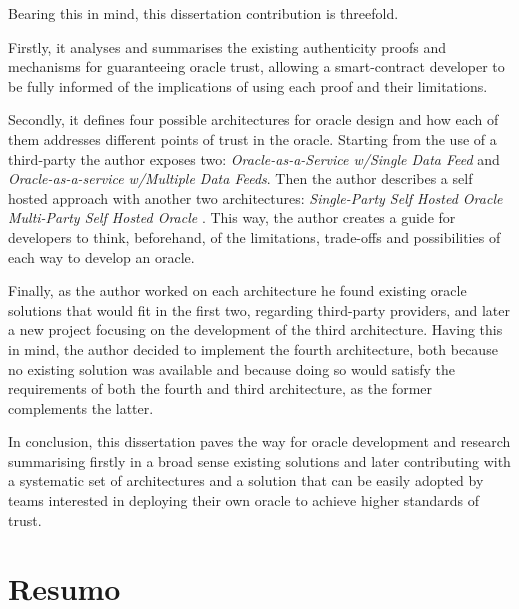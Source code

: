 Bearing this in mind, this dissertation contribution is threefold.

Firstly, it analyses and summarises the existing authenticity proofs and mechanisms for guaranteeing oracle trust, allowing a smart-contract developer to be fully informed of the implications of using each proof and their limitations.

Secondly, it defines four possible architectures for oracle design and how each of them addresses different points of trust in the oracle. Starting from the use of a third-party the author exposes two: \textit{Oracle-as-a-Service w/Single Data Feed} and \textit{Oracle-as-a-service w/Multiple Data Feeds}. Then the author describes a self hosted approach with another two architectures: \textit{Single-Party Self Hosted Oracle} \textit{Multi-Party Self Hosted Oracle }. This way, the author creates a guide for developers to think, beforehand, of the limitations, trade-offs and possibilities of each way to develop an oracle.

Finally, as the author worked on each architecture he found existing oracle solutions that would fit in the first two, regarding third-party providers, and later a new project focusing on the development of the third architecture. Having this in mind, the author decided to implement the fourth architecture, both because no existing solution was available and because doing so would satisfy the requirements of both the fourth and third architecture, as the former complements the latter.

In conclusion, this dissertation paves the way for oracle development and research summarising firstly in a broad sense existing solutions and later contributing with a systematic set of architectures and a solution that can be easily adopted by teams interested in deploying their own oracle to achieve higher standards of trust.


\chapter*{Resumo}





